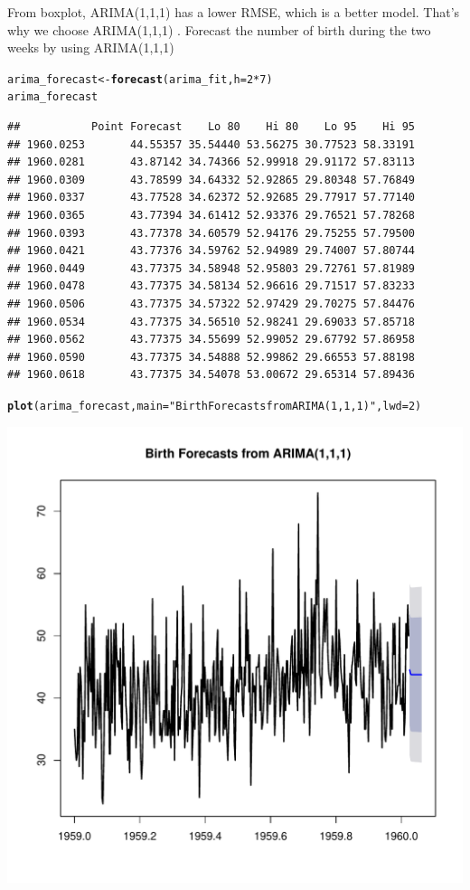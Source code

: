 \documentclass[10pt]{article}\usepackage[]{graphicx}\usepackage[]{color}
\makeatletter
\def\maxwidth{ %
  \ifdim\Gin@nat@width>\linewidth
    \linewidth
  \else
    \Gin@nat@width
  \fi
}
\newcommand{\hlnum}[1]{\textcolor[rgb]{0.686,0.059,0.569}{#1}}%
\newcommand{\hlstr}[1]{\textcolor[rgb]{0.192,0.494,0.8}{#1}}%
\newcommand{\hlopt}[1]{\textcolor[rgb]{0,0,0}{#1}}%
\newcommand{\hlstd}[1]{\textcolor[rgb]{0.345,0.345,0.345}{#1}}%
\newcommand{\hlkwb}[1]{\textcolor[rgb]{0.69,0.353,0.396}{#1}}%
\newcommand{\hlkwc}[1]{\textcolor[rgb]{0.333,0.667,0.333}{#1}}%
\newcommand{\hlkwd}[1]{\textcolor[rgb]{0.737,0.353,0.396}{\textbf{#1}}}%
\newenvironment{kframe}{%
 \def\at@end@of@kframe{}%
 \ifinner\ifhmode%
  \def\at@end@of@kframe{\end{minipage}}%
  \begin{minipage}{\columnwidth}%
 \fi\fi%
 \def\FrameCommand##1{\hskip\@totalleftmargin \hskip-\fboxsep
 \colorbox{shadecolor}{##1}\hskip-\fboxsep
     \hskip-\linewidth \hskip-\@totalleftmargin \hskip\columnwidth}%
 \MakeFramed {\advance\hsize-\width
   \@totalleftmargin\z@ \linewidth\hsize
   \@setminipage}}%
 {\par\unskip\endMakeFramed%
 \at@end@of@kframe}
\newenvironment{knitrout}{}{} %
\makeatother
\begin{document}
From boxplot, ARIMA(1,1,1) has a lower RMSE, which is a better model. That's why we choose ARIMA(1,1,1)
. Forecast the number of birth during the two weeks by using ARIMA(1,1,1)
\begin{knitrout}
\color{fgcolor}\begin{kframe}
\begin{alltt}
\hlstd{arima_forecast} \hlkwb{<-} \hlkwd{forecast}\hlstd{(arima_fit,} \hlkwc{h} \hlstd{=} \hlnum{2}\hlopt{*}\hlnum{7}\hlstd{)}
\hlstd{arima_forecast}
\end{alltt}
\begin{verbatim}
##           Point Forecast    Lo 80    Hi 80    Lo 95    Hi 95
## 1960.0253       44.55357 35.54440 53.56275 30.77523 58.33191
## 1960.0281       43.87142 34.74366 52.99918 29.91172 57.83113
## 1960.0309       43.78599 34.64332 52.92865 29.80348 57.76849
## 1960.0337       43.77528 34.62372 52.92685 29.77917 57.77140
## 1960.0365       43.77394 34.61412 52.93376 29.76521 57.78268
## 1960.0393       43.77378 34.60579 52.94176 29.75255 57.79500
## 1960.0421       43.77376 34.59762 52.94989 29.74007 57.80744
## 1960.0449       43.77375 34.58948 52.95803 29.72761 57.81989
## 1960.0478       43.77375 34.58134 52.96616 29.71517 57.83233
## 1960.0506       43.77375 34.57322 52.97429 29.70275 57.84476
## 1960.0534       43.77375 34.56510 52.98241 29.69033 57.85718
## 1960.0562       43.77375 34.55699 52.99052 29.67792 57.86958
## 1960.0590       43.77375 34.54888 52.99862 29.66553 57.88198
## 1960.0618       43.77375 34.54078 53.00672 29.65314 57.89436
\end{verbatim}
\begin{alltt}
\hlkwd{plot}\hlstd{(arima_forecast,}\hlkwc{main} \hlstd{=} \hlstr{"Birth Forecasts from ARIMA(1,1,1)"}\hlstd{,}\hlkwc{lwd} \hlstd{=} \hlnum{2}\hlstd{)}
\end{alltt}
\end{kframe}
\includegraphics[width=\maxwidth]{figure/unnamed-chunk-15-1} 


\end{knitrout}
\end{document}
